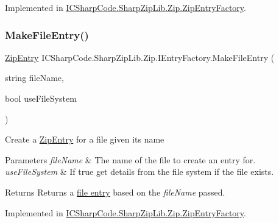 Implemented in \hyperlink{class_i_c_sharp_code_1_1_sharp_zip_lib_1_1_zip_1_1_zip_entry_factory_a29a2abb7d5c0bea2ac1c82a2d7da7075}{I\+C\+Sharp\+Code.\+Sharp\+Zip\+Lib.\+Zip.\+Zip\+Entry\+Factory}.

\mbox{\label{interface_i_c_sharp_code_1_1_sharp_zip_lib_1_1_zip_1_1_i_entry_factory_a576fc2a664ce3d629d04d12f1b964d87}} 
\subsubsection{\texorpdfstring{Make\+File\+Entry()}{MakeFileEntry()}\hspace{0.1cm}{\footnotesize\ttfamily [2/2]}}
{\footnotesize\ttfamily \hyperlink{class_i_c_sharp_code_1_1_sharp_zip_lib_1_1_zip_1_1_zip_entry}{Zip\+Entry} I\+C\+Sharp\+Code.\+Sharp\+Zip\+Lib.\+Zip.\+I\+Entry\+Factory.\+Make\+File\+Entry (\begin{DoxyParamCaption}\item[{string}]{file\+Name,  }\item[{bool}]{use\+File\+System }\end{DoxyParamCaption})}



Create a \hyperlink{class_i_c_sharp_code_1_1_sharp_zip_lib_1_1_zip_1_1_zip_entry}{Zip\+Entry} for a file given its name 


\begin{DoxyParams}{Parameters}
{\em file\+Name} & The name of the file to create an entry for.\\
\hline
{\em use\+File\+System} & If true get details from the file system if the file exists.\\
\hline
\end{DoxyParams}
\begin{DoxyReturn}{Returns}
Returns a \hyperlink{class_i_c_sharp_code_1_1_sharp_zip_lib_1_1_zip_1_1_zip_entry}{file entry} based on the {\itshape file\+Name}  passed.
\end{DoxyReturn}


Implemented in \hyperlink{class_i_c_sharp_code_1_1_sharp_zip_lib_1_1_zip_1_1_zip_entry_factory_acd4d7e502c4517ce588d2660e56c14b5}{I\+C\+Sharp\+Code.\+Sharp\+Zip\+Lib.\+Zip.\+Zip\+Entry\+Factory}.




